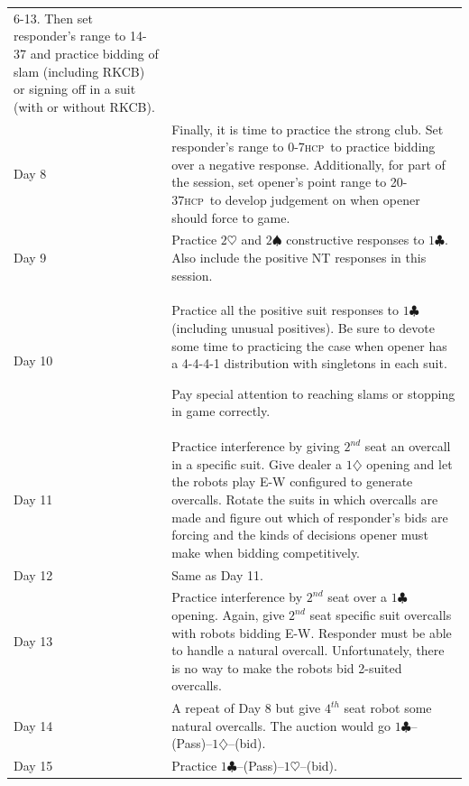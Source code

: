 \documentclass[a4paper,article,oneside]{memoir}
\newcommand{\hcp}{\textsc{hcp}}
\begin{document}
\begin{longtable}{l|p{10cm}}
          6-13. Then set responder's range to 14-37 and practice
          bidding of slam (including RKCB) or signing off in a suit
          (with or without RKCB). \\
  Day 8 & Finally, it is time to practice the strong club. Set
          responder's range to 0-7\hcp\ to practice bidding over a
          negative response. Additionally, for part of the session,
          set opener's point range to 20-37\hcp\ to develop judgement
          on when opener should force to game. \\
  Day 9 & Practice $2\heartsuit$ and $2\spadesuit$ constructive
          responses to $1\clubsuit$. Also include the positive NT
          responses in this session. \\
  Day 10 & Practice all the positive suit responses to $1\clubsuit$
           (including unusual positives). Be sure to devote some time
           to practicing the case when opener has a 4-4-4-1
           distribution with singletons in each suit.
         
           Pay special attention to reaching slams or stopping in game
           correctly. \\
  Day 11 & Practice interference by giving $2^{nd}$ seat an overcall
           in a specific suit. Give dealer a $1\diamondsuit$ opening
           and let the robots play E-W configured to generate
           overcalls. Rotate the suits in which overcalls are made and
           figure out which of responder's bids are forcing and the
           kinds of decisions opener must make when bidding
           competitively. \\
  Day 12 & Same as Day 11. \\
  Day 13 & Practice interference by $2^{nd}$ seat over a $1\clubsuit$
           opening. Again, give $2^{nd}$ seat specific suit overcalls
           with robots bidding E-W. Responder must be able to handle a
           natural overcall. Unfortunately, there is no way to make
           the robots bid 2-suited overcalls. \\
  Day 14 & A repeat of Day 8 but give $4^{th}$ seat robot some natural
           overcalls. The auction would go
           $1\clubsuit$--(Pass)--$1\diamondsuit$--(bid). \\
  Day 15 & Practice $1\clubsuit$--(Pass)--$1\heartsuit$--(bid). \\
\hline
\end{longtable}
\end{document}
